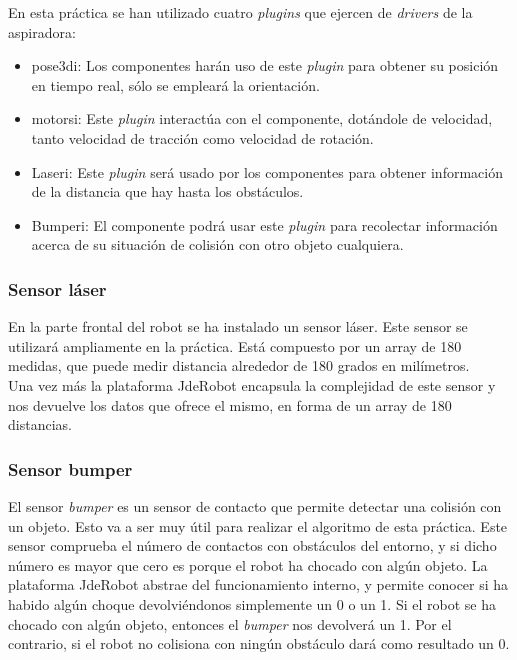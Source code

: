 En esta práctica se han utilizado cuatro \textit{plugins} que ejercen de \textit{drivers} de la aspiradora: 

\begin{itemize}
\item pose3di: Los componentes harán uso de este \textit{plugin} para obtener su posición en tiempo real, sólo se empleará la orientación. 
\item motorsi: Este \textit{plugin} interactúa con el componente, dotándole de velocidad, tanto velocidad de tracción como velocidad de rotación.
\item Laseri: Este \textit{plugin} será usado por los componentes para obtener información de la distancia que hay hasta los obstáculos.
\item Bumperi: El componente podrá usar este \textit{plugin} para recolectar información acerca de su situación de colisión con otro objeto cualquiera.
\end{itemize}

\subsubsection{Sensor láser}
En la parte frontal del robot se ha instalado un sensor láser. Este sensor se utilizará ampliamente en la práctica. Está compuesto por un array de 180 medidas, que puede medir distancia alrededor de 180 grados en milímetros.\\

Una vez más la plataforma JdeRobot encapsula la complejidad de este sensor y nos devuelve los datos que ofrece el mismo, en forma de un array de 180 distancias.

\subsubsection{Sensor bumper}
El sensor \textit{bumper} es un sensor de contacto que permite detectar una colisión con un objeto. Esto va a ser muy útil para realizar el algoritmo de esta práctica. Este sensor comprueba el número de contactos con obstáculos del entorno, y si dicho número es mayor que cero es porque el robot ha chocado con algún objeto. La plataforma JdeRobot abstrae del funcionamiento interno, y permite conocer si ha habido algún choque devolviéndonos simplemente un 0 o un 1. Si el robot se ha chocado con algún objeto, entonces el \textit{bumper} nos devolverá un 1. Por el contrario, si el robot no colisiona con ningún obstáculo dará como resultado un 0.



